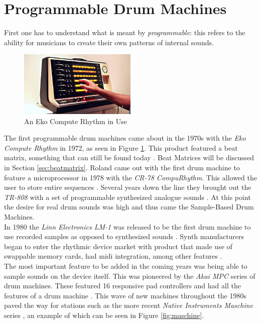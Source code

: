 \documentclass[12pt,a4paper]{report}
\begin{document}
\section{Programmable Drum Machines}
First one has to understand what is meant by \textit{programmable}: this refers to the ability for musicians to create their own patterns of internal sounds.\\
\begin{figure}[h!]
	\begin{center}
		\includegraphics[width = 0.5\textwidth, angle=0, origin=c]{computerhythm.jpg}
		\caption{An Eko Compute Rhythm in Use \cite{comprhythImg}}
		\label{fig:comprhyt}
	\end{center}
\end{figure}
The first programmable drum machines came about in the 1970s with the \textit{Eko Compute Rhythm} in 1972, as seen in Figure \ref{fig:comprhyt}. This product featured a beat matrix, something that can still be found today \cite{beatgoeson}. Beat Matrices will be discussed in Section \ref{sec:beatmatrix}. Roland came out with the first drum machine to feature a microprocessor in 1978 with the \textit{CR-78 CompuRhythm}. This allowed the user to store entire sequences \cite{cr78}. Several years down the line they brought out the \textit{TR-808} with a set of programmable synthesized analogue sounds \cite{tr808, beatgoeson}. At this point the desire for real drum sounds was high and thus came the Sample-Based Drum Machines.\\
In 1980 the \textit{Linn Electronics LM-1} was released to be the first drum machine to use recorded samples as opposed to synthesized sounds \cite{beatgoeson}. Synth manufacturers began to enter the rhythmic device market with product that made use of swappable memory cards, had \ac{midi} integration, among other features \cite{rhythmart}.\\
The most important feature to be added in the coming years was being able to sample sounds on the device itself. This was pioneered by the \textit{Akai MPC} series of drum machines. These featured 16 responsive pad controllers and had all the features of a drum machine \cite{beatgoeson, rhythmart}. This wave of new machines throughout the 1980s paved the way for stations such as the more recent \textit{Native Instruments Maschine} series \cite{rhythmart}, an example of which can be seen in Figure \ref{fig:maschine}.\\
\end{document}
